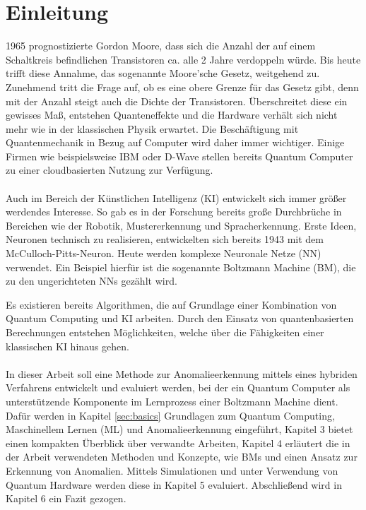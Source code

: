 \section{Einleitung}
\label{sec:intro}
1965 prognostizierte Gordon Moore, dass sich die Anzahl der auf einem Schaltkreis befindlichen Transistoren ca. alle 2 Jahre verdoppeln würde. Bis heute trifft diese Annahme, das sogenannte Moore'sche Gesetz, weitgehend zu. Zunehmend tritt die Frage auf, ob es eine obere Grenze für das Gesetz gibt, denn mit der Anzahl steigt auch die Dichte der Transistoren. Überschreitet diese ein gewisses Maß, entstehen Quanteneffekte und die Hardware verhält sich nicht mehr wie in der klassischen Physik erwartet. Die Beschäftigung mit Quantenmechanik in Bezug auf Computer wird daher immer wichtiger. Einige Firmen wie beispielsweise IBM oder D-Wave stellen bereits Quantum Computer zu einer cloudbasierten Nutzung zur Verfügung. \cite{moore, qc-mainzer}
\\\\
Auch im Bereich der Künstlichen Intelligenz (KI) entwickelt sich immer größer werdendes Interesse. So gab es in der Forschung bereits große Durchbrüche in Bereichen wie der Robotik, Mustererkennung und Spracherkennung. Erste Ideen, Neuronen technisch zu realisieren, entwickelten sich bereits 1943 mit dem McCulloch-Pitts-Neuron. Heute werden komplexe Neuronale Netze (NN) verwendet. Ein Beispiel hierfür ist die sogenannte Boltzmann Machine (BM), die zu den ungerichteten NNs gezählt wird. \cite{ki, Hinton2007}


Es existieren bereits Algorithmen, die auf Grundlage einer Kombination von Quantum Computing und KI arbeiten. Durch den Einsatz von quantenbasierten Berechnungen entstehen Möglichkeiten, welche über die Fähigkeiten einer klassischen KI hinaus gehen. \cite{qc-mainzer}
\\\\
In dieser Arbeit soll eine Methode zur Anomalieerkennung mittels eines hybriden Verfahrens entwickelt und evaluiert werden, bei der ein Quantum Computer als unterstützende Komponente im Lernprozess einer Boltzmann Machine dient. Dafür werden in Kapitel \ref{sec:basics} Grundlagen zum Quantum Computing, Maschinellem Lernen (ML) und Anomalieerkennung eingeführt, Kapitel 3 bietet einen kompakten Überblick über verwandte Arbeiten, Kapitel 4 erläutert die in der Arbeit verwendeten Methoden und Konzepte, wie BMs und einen Ansatz zur Erkennung von Anomalien. Mittels Simulationen und unter Verwendung von Quantum Hardware werden diese in Kapitel 5 evaluiert. Abschließend wird in Kapitel 6 ein Fazit gezogen.

